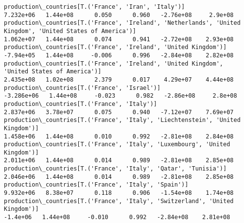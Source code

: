 \documentclass[11pt]{article}
\begin{document}
\begin{Verbatim}[commandchars=\\\{\}]
production\_countries[T.('France', 'Iran', 'Italy')]                                                                                                                                    7.232e+06   1.44e+08      0.050      0.960   -2.76e+08     2.9e+08
production\_countries[T.('France', 'Ireland', 'Netherlands', 'United Kingdom', 'United States of America')]                                                                             1.062e+07   1.44e+08      0.074      0.941   -2.72e+08    2.93e+08
production\_countries[T.('France', 'Ireland', 'United Kingdom')]                                                                                                                        -7.94e+05   1.44e+08     -0.006      0.996   -2.84e+08    2.82e+08
production\_countries[T.('France', 'Ireland', 'United Kingdom', 'United States of America')]                                                                                            2.435e+08   1.02e+08      2.379      0.017    4.29e+07    4.44e+08
production\_countries[T.('France', 'Israel')]                                                                                                                                          -3.286e+06   1.44e+08     -0.023      0.982   -2.86e+08     2.8e+08
production\_countries[T.('France', 'Italy')]                                                                                                                                            2.837e+06   3.78e+07      0.075      0.940   -7.12e+07    7.69e+07
production\_countries[T.('France', 'Italy', 'Liechtenstein', 'United Kingdom')]                                                                                                         1.458e+06   1.44e+08      0.010      0.992   -2.81e+08    2.84e+08
production\_countries[T.('France', 'Italy', 'Luxembourg', 'United Kingdom')]                                                                                                            2.011e+06   1.44e+08      0.014      0.989   -2.81e+08    2.85e+08
production\_countries[T.('France', 'Italy', 'Qatar', 'Tunisia')]                                                                                                                        2.046e+06   1.44e+08      0.014      0.989   -2.81e+08    2.85e+08
production\_countries[T.('France', 'Italy', 'Spain')]                                                                                                                                   9.932e+06   8.38e+07      0.118      0.906   -1.54e+08    1.74e+08
production\_countries[T.('France', 'Italy', 'Switzerland', 'United Kingdom')]                                                                                                            -1.4e+06   1.44e+08     -0.010      0.992   -2.84e+08    2.81e+08

\end{Verbatim}
\end{document}
